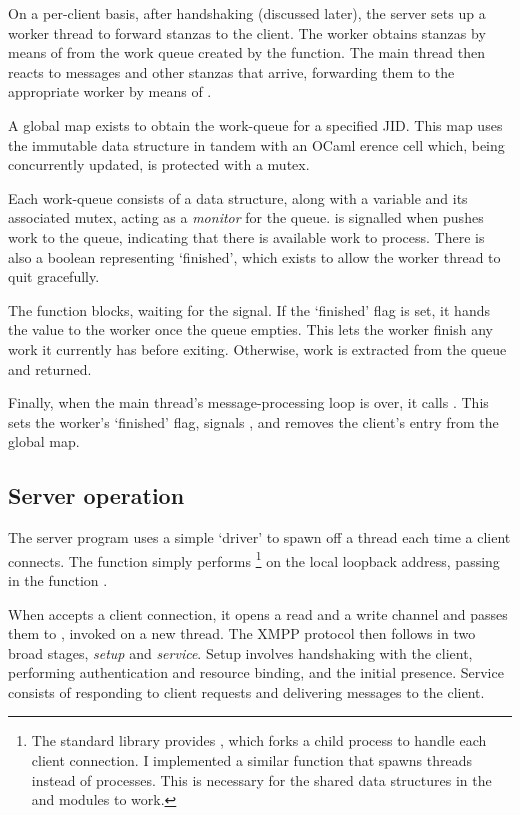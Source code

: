 On a per-client basis, after handshaking (discussed later), the server sets up a worker thread to forward stanzas to the client. The worker obtains stanzas by means of  from the work queue created by the  function. The main thread then reacts to messages and other stanzas that arrive, forwarding them to the appropriate worker by means of .

A global map exists to obtain the work-queue for a specified JID. This map uses the immutable  data structure in tandem with an OCaml erence cell which, being concurrently updated, is protected with a mutex.

Each work-queue consists of a  data structure, along with a  variable  and its associated mutex, acting as a \emph{monitor} for the queue.  is signalled when  pushes work to the queue, indicating that there is available work to process. There is also a boolean representing `finished', which exists to allow the worker thread to quit gracefully.

The  function blocks, waiting for the  signal. If the `finished' flag is set, it hands the value  to the worker once the queue empties. This lets the worker finish any work it currently has before exiting. Otherwise, work is extracted from the queue and returned.

Finally, when the main thread's message-processing loop is over, it calls . This sets the worker's `finished' flag, signals , and removes the client's entry from the global map.

\subsection{Server operation}
The server program uses a simple `driver' to spawn off a thread each time a client connects. The function  simply performs \footnote{The standard library provides , which forks a child process to handle each client connection. I implemented a similar function that spawns threads instead of processes. This is necessary for the shared data structures in the  and  modules to work.} on the local loopback address, passing in the function .

When  accepts a client connection, it opens a read and a write channel and passes them to , invoked on a new thread. The XMPP protocol then follows in two broad stages, \emph{setup} and \emph{service}. Setup involves handshaking with the client, performing authentication and resource binding, and the initial presence. Service consists of responding to client requests and delivering messages to the client.

